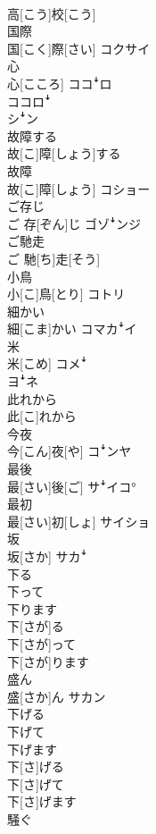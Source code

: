 \documentclass[8pt]{extreport}
\begin{document}
\begin{CJK}{UTF8}{min}
\\	高[こう]校[こう]	
\\	国際	
\\	国[こく]際[さい]	コクサイ
\\	心	
\\	心[こころ]	ココꜜロ 
\\	ココロꜜ 
\\	シꜜン
\\	故障する	
\\	故[こ]障[しょう]する	
\\	故障	
\\	故[こ]障[しょう]	コショー
\\	ご存じ	
\\	ご 存[ぞん]じ	ゴゾꜜンジ
\\	ご馳走	
\\	ご 馳[ち]走[そう]	
\\	小鳥	
\\	小[こ]鳥[とり]	コトリ
\\	細かい	
\\	細[こま]かい	コマカꜜイ
\\	米	
\\	米[こめ]	コメꜜ 
\\	ヨꜜネ
\\	此れから	
\\	此[こ]れから	
\\	今夜	
\\	今[こん]夜[や]	コꜜンヤ
\\	最後	
\\	最[さい]後[ご]	サꜜイコ°
\\	最初	
\\	最[さい]初[しょ]	サイショ
\\	坂	
\\	坂[さか]	サカꜜ
\\	下る 
\\	下って 
\\	下ります	
\\	下[さが]る 
\\	下[さが]って 
\\	下[さが]ります	
\\	盛ん	
\\	盛[さか]ん	サカン
\\	下げる 
\\	下げて 
\\	下げます	
\\	下[さ]げる 
\\	下[さ]げて 
\\	下[さ]げます	
\\	騒ぐ 

\end{CJK}
\end{document}
